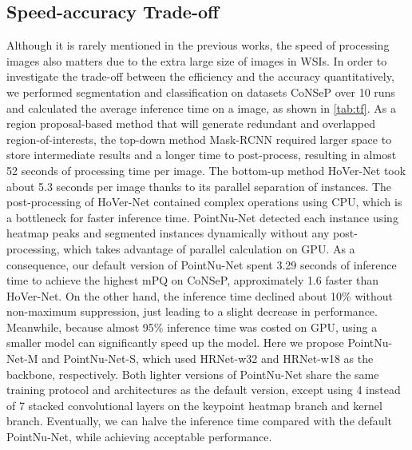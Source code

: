 \documentclass[lettersize,journal]{IEEEtran}
\begin{document}
\subsection{Speed-accuracy Trade-off}
Although it is rarely mentioned in the previous works, the speed of processing images  also matters due to the extra large size of images in WSIs. In order to investigate the trade-off between the efficiency and the accuracy quantitatively, we performed segmentation and classification on datasets CoNSeP over 10 runs and calculated the average inference time on a  image, as shown in \autoref{tab:tf}. As a region proposal-based method that will generate redundant and overlapped region-of-interests, the top-down method Mask-RCNN required larger space to store intermediate results and a longer time to post-process, resulting in almost 52 seconds of processing time per image. The bottom-up method HoVer-Net took about 5.3 seconds per image thanks to its parallel separation of instances. The post-processing of HoVer-Net contained complex operations using CPU, which is a bottleneck for faster inference time. PointNu-Net detected each instance using heatmap peaks and segmented instances dynamically without any post-processing, which takes advantage of parallel calculation on GPU. As a consequence, our default version of PointNu-Net spent 3.29 seconds of inference time to achieve the highest mPQ on CoNSeP, approximately 1.6  faster than HoVer-Net. On the other hand, the inference time declined about 10\% without non-maximum suppression, just leading to a slight decrease in performance. Meanwhile, because almost 95\% inference time was costed on GPU, using a smaller model can significantly speed up the model. Here we propose PointNu-Net-M and PointNu-Net-S, which used HRNet-w32 and HRNet-w18 as the backbone, respectively. Both  lighter versions of PointNu-Net share the same training protocol and architectures as the default version, except using 4 instead of 7 stacked convolutional layers on the keypoint heatmap branch and kernel branch. Eventually, we can halve the inference time compared with the default PointNu-Net, while achieving acceptable performance. 
\end{document}
